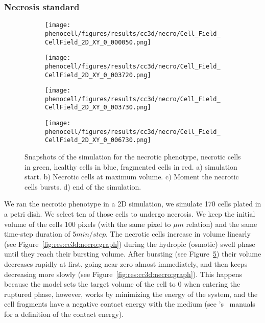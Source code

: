 \subsubsection{Necrosis standard}\label{sec:res:cc3d:necro}


\begin{figure}[!htbp]
    \centering
    \begin{subfigure}{.35\textwidth}
        \texttt{[image: phenocell/figures/results/cc3d/necro/Cell\_Field\_CellField\_2D\_XY\_0\_000050.png]}
        \caption{}\label{fig:res:cc3d:necro:space:0}
    \end{subfigure}
    \begin{subfigure}{.35\textwidth}
        \texttt{[image: phenocell/figures/results/cc3d/necro/Cell\_Field\_CellField\_2D\_XY\_0\_003720.png]}
        \caption{}\label{fig:res:cc3d:necro:space:swollen}
    \end{subfigure}
    \begin{subfigure}{.35\textwidth}
        \texttt{[image: phenocell/figures/results/cc3d/necro/Cell\_Field\_CellField\_2D\_XY\_0\_003730.png]}
        \caption{}\label{fig:res:cc3d:necro:space:burst}
    \end{subfigure}
    \begin{subfigure}{.35\textwidth}
        \texttt{[image: phenocell/figures/results/cc3d/necro/Cell\_Field\_CellField\_2D\_XY\_0\_006730.png]}
        \caption{}\label{fig:res:cc3d:necro:space:end}
    \end{subfigure}
    \caption{Snapshots of the \ccds simulation for the necrotic phenotype, necrotic cells in green, healthy cells in blue, fragmented cells in red. a) simulation start. b) Necrotic cells at maximum volume. c) Moment the necrotic cells bursts. d) end of the simulation.}
    \label{fig:res:cc3d:necro:space}
\end{figure}


We ran the necrotic phenotype in a 2D \ccds simulation, we simulate 170 cells plated in a petri dish. We select ten of those cells to undergo necrosis. We keep the initial volume of the cells 100 pixels (with the same pixel to $\mu m$ relation) and the same time-step duration of $5min/step$. The necrotic cells increase in volume linearly (see Figure~\ref{fig:res:cc3d:necro:graph}) during the hydropic (osmotic) swell phase until they reach their bursting volume. After bursting (see Figure~\ref{fig:res:cc3d:necro:space}) their volume decreases rapidly at first, going near zero almost immediately, and then keeps decreasing more slowly (see Figure~\ref{fig:res:cc3d:necro:graph}). This happens because the \pcps model sets the target volume of the cell to 0 when entering the ruptured phase, however, \ccds works by minimizing the energy of the system, and the cell fragments have a negative contact energy with the medium (see \ccd's~\cite{swat_multi-scale_2012} manuals for a definition of the contact energy).

